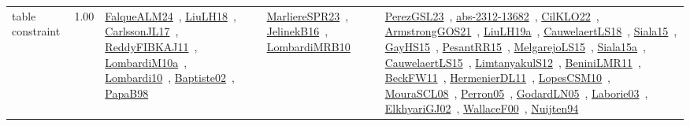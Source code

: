{\begin{longtable}{p{3cm}r>{\raggedright\arraybackslash}p{6cm}>{\raggedright\arraybackslash}p{6cm}>{\raggedright\arraybackslash}p{8cm}}
\index{table constraint}\index{Constraints!table constraint}table constraint &  1.00 & \href{../works/FalqueALM24.pdf}{FalqueALM24}~\cite{FalqueALM24}, \href{../works/LiuLH18.pdf}{LiuLH18}~\cite{LiuLH18}, \href{../works/CarlssonJL17.pdf}{CarlssonJL17}~\cite{CarlssonJL17}, \href{../works/ReddyFIBKAJ11.pdf}{ReddyFIBKAJ11}~\cite{ReddyFIBKAJ11}, \href{../works/LombardiM10a.pdf}{LombardiM10a}~\cite{LombardiM10a}, \href{../works/Lombardi10.pdf}{Lombardi10}~\cite{Lombardi10}, \href{../works/Baptiste02.pdf}{Baptiste02}~\cite{Baptiste02}, \href{../works/PapaB98.pdf}{PapaB98}~\cite{PapaB98} & \href{../works/MarliereSPR23.pdf}{MarliereSPR23}~\cite{MarliereSPR23}, \href{../works/JelinekB16.pdf}{JelinekB16}~\cite{JelinekB16}, \href{../works/LombardiMRB10.pdf}{LombardiMRB10}~\cite{LombardiMRB10} & \href{../works/PerezGSL23.pdf}{PerezGSL23}~\cite{PerezGSL23}, \href{../works/abs-2312-13682.pdf}{abs-2312-13682}~\cite{abs-2312-13682}, \href{../works/CilKLO22.pdf}{CilKLO22}~\cite{CilKLO22}, \href{../works/ArmstrongGOS21.pdf}{ArmstrongGOS21}~\cite{ArmstrongGOS21}, \href{../works/LiuLH19a.pdf}{LiuLH19a}~\cite{LiuLH19a}, \href{../works/CauwelaertLS18.pdf}{CauwelaertLS18}~\cite{CauwelaertLS18}, \href{../works/Siala15.pdf}{Siala15}~\cite{Siala15}, \href{../works/GayHS15.pdf}{GayHS15}~\cite{GayHS15}, \href{../works/PesantRR15.pdf}{PesantRR15}~\cite{PesantRR15}, \href{../works/MelgarejoLS15.pdf}{MelgarejoLS15}~\cite{MelgarejoLS15}, \href{../works/Siala15a.pdf}{Siala15a}~\cite{Siala15a}, \href{../works/CauwelaertLS15.pdf}{CauwelaertLS15}~\cite{CauwelaertLS15}, \href{../works/LimtanyakulS12.pdf}{LimtanyakulS12}~\cite{LimtanyakulS12}, \href{../works/BeniniLMR11.pdf}{BeniniLMR11}~\cite{BeniniLMR11}, \href{../works/BeckFW11.pdf}{BeckFW11}~\cite{BeckFW11}, \href{../works/HermenierDL11.pdf}{HermenierDL11}~\cite{HermenierDL11}, \href{../works/LopesCSM10.pdf}{LopesCSM10}~\cite{LopesCSM10}, \href{../works/MouraSCL08.pdf}{MouraSCL08}~\cite{MouraSCL08}, \href{../works/Perron05.pdf}{Perron05}~\cite{Perron05}, \href{../works/GodardLN05.pdf}{GodardLN05}~\cite{GodardLN05}, \href{../works/Laborie03.pdf}{Laborie03}~\cite{Laborie03}, \href{../works/ElkhyariGJ02.pdf}{ElkhyariGJ02}~\cite{ElkhyariGJ02}, \href{../works/WallaceF00.pdf}{WallaceF00}~\cite{WallaceF00}, \href{../works/Nuijten94.pdf}{Nuijten94}~\cite{Nuijten94}\\
\end{longtable}
}

\clearpage

